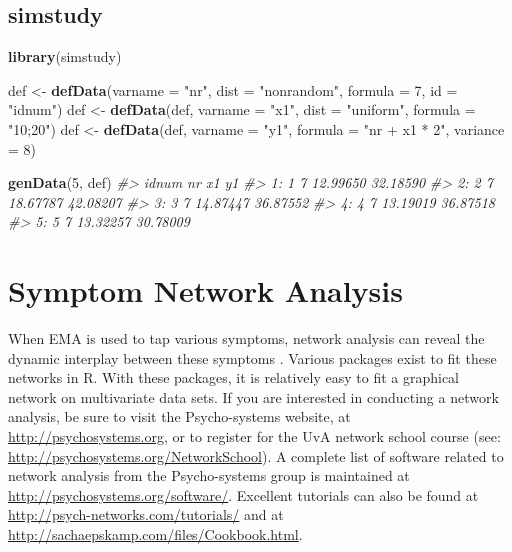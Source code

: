\documentclass[]{book}
\newenvironment{Shaded}{\begin{snugshade}}{\end{snugshade}}
\newcommand{\KeywordTok}[1]{\textcolor[rgb]{0.13,0.29,0.53}{\textbf{#1}}}
\newcommand{\DataTypeTok}[1]{\textcolor[rgb]{0.13,0.29,0.53}{#1}}
\newcommand{\DecValTok}[1]{\textcolor[rgb]{0.00,0.00,0.81}{#1}}
\newcommand{\StringTok}[1]{\textcolor[rgb]{0.31,0.60,0.02}{#1}}
\newcommand{\CommentTok}[1]{\textcolor[rgb]{0.56,0.35,0.01}{\textit{#1}}}
\newcommand{\NormalTok}[1]{#1}
\begin{document}
\subsection{simstudy}\label{simstudy}

\begin{Shaded}
\begin{Highlighting}[]
\KeywordTok{library}\NormalTok{(simstudy)}

\NormalTok{def <-}\StringTok{ }\KeywordTok{defData}\NormalTok{(}\DataTypeTok{varname =} \StringTok{"nr"}\NormalTok{, }\DataTypeTok{dist =} \StringTok{"nonrandom"}\NormalTok{, }\DataTypeTok{formula =} \DecValTok{7}\NormalTok{, }\DataTypeTok{id =} \StringTok{"idnum"}\NormalTok{)}
\NormalTok{def <-}\StringTok{ }\KeywordTok{defData}\NormalTok{(def, }\DataTypeTok{varname =} \StringTok{"x1"}\NormalTok{, }\DataTypeTok{dist =} \StringTok{"uniform"}\NormalTok{, }\DataTypeTok{formula =} \StringTok{"10;20"}\NormalTok{)}
\NormalTok{def <-}\StringTok{ }\KeywordTok{defData}\NormalTok{(def, }\DataTypeTok{varname =} \StringTok{"y1"}\NormalTok{, }\DataTypeTok{formula =} \StringTok{"nr + x1 * 2"}\NormalTok{, }\DataTypeTok{variance =} \DecValTok{8}\NormalTok{)}

\KeywordTok{genData}\NormalTok{(}\DecValTok{5}\NormalTok{, def)}
\CommentTok{#>    idnum nr       x1       y1}
\CommentTok{#> 1:     1  7 12.99650 32.18590}
\CommentTok{#> 2:     2  7 18.67787 42.08207}
\CommentTok{#> 3:     3  7 14.87447 36.87552}
\CommentTok{#> 4:     4  7 13.19019 36.87518}
\CommentTok{#> 5:     5  7 13.32257 30.78009}
\end{Highlighting}
\end{Shaded}

\section{Symptom Network Analysis}\label{symptom-network-analysis}

 

When EMA is used to tap various symptoms, network analysis can reveal
the dynamic interplay between these symptoms
\citep{Borsboom2013, Borsboom2017, Bringmann2015}. Various packages
exist to fit these networks in R. With these packages, it is relatively
easy to fit a graphical network on multivariate data sets. If you are
interested in conducting a network analysis, be sure to visit the
Psycho-systems website, at \url{http://psychosystems.org}, or to
register for the UvA network school course (see:
\url{http://psychosystems.org/NetworkSchool}). A complete list of
software related to network analysis from the Psycho-systems group is
maintained at \url{http://psychosystems.org/software/}. Excellent
tutorials can also be found at
\url{http://psych-networks.com/tutorials/} and at
\url{http://sachaepskamp.com/files/Cookbook.html}.
\end{document}
